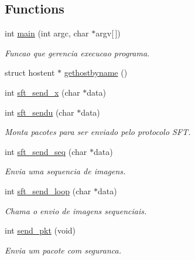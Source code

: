 \subsection*{Functions}
\begin{DoxyCompactItemize}
\item 
int \hyperlink{group__tools_ga0ddf1224851353fc92bfbff6f499fa97}{main} (int argc, char $\ast$argv\mbox{[}$\,$\mbox{]})
\begin{DoxyCompactList}\small\item\em Funcao que gerencia execucao programa. \item\end{DoxyCompactList}\item 
struct hostent $\ast$ \hyperlink{group__tools_gad7ff056dc2e24806b50deab1a1dcc4d5}{gethostbyname} ()
\item 
int \hyperlink{group__tools_ga3aa69e98b6e896f4620e18ce70203826}{sft\_\-send\_\-x} (char $\ast$data)
\item 
int \hyperlink{group__tools_gabba736c5a748cafb42da716e76cb3bc0}{sft\_\-sendu} (char $\ast$data)
\begin{DoxyCompactList}\small\item\em Monta pacotes para ser enviado pelo protocolo SFT. \item\end{DoxyCompactList}\item 
int \hyperlink{group__tools_gae277076e8df537a2e2a9be5eb986dfae}{sft\_\-send\_\-seq} (char $\ast$data)
\begin{DoxyCompactList}\small\item\em Envia uma sequencia de imagens. \item\end{DoxyCompactList}\item 
int \hyperlink{group__tools_ga169e8375031166aa98b2a4ce8f8f05e5}{sft\_\-send\_\-loop} (char $\ast$data)
\begin{DoxyCompactList}\small\item\em Chama o envio de imagens sequenciais. \item\end{DoxyCompactList}\item 
int \hyperlink{group__tools_ga21607e3d9ec877c9182082896d652e1a}{send\_\-pkt} (void)
\begin{DoxyCompactList}\small\item\em Envia um pacote com seguranca. \item\end{DoxyCompactList}\item 

\end{DoxyCompactItemize}

